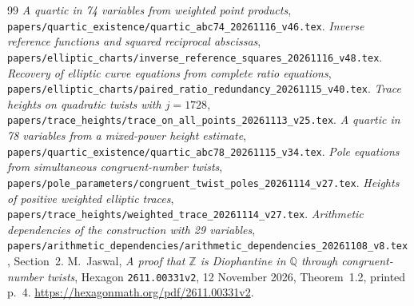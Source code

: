 \documentclass[11pt,a4paper]{article}
\newcommand{\Q}{\mathbb Q}\newcommand{\Z}{\mathbb Z}
\begin{document}
\begin{thebibliography}{99}
\emph{A quartic in 74 variables from weighted point products},
\nolinkurl{papers/quartic_existence/quartic_abc74_20261116_v46.tex}.
\emph{Inverse reference functions and squared reciprocal abscissas},
\nolinkurl{papers/elliptic_charts/inverse_reference_squares_20261116_v48.tex}.
\emph{Recovery of elliptic curve equations from complete ratio equations},
\nolinkurl{papers/elliptic_charts/paired_ratio_redundancy_20261115_v40.tex}.
\emph{Trace heights on quadratic twists with $j=1728$},
\nolinkurl{papers/trace_heights/trace_on_all_points_20261113_v25.tex}.
\emph{A quartic in 78 variables from a mixed-power height estimate},
\nolinkurl{papers/quartic_existence/quartic_abc78_20261115_v34.tex}.
\emph{Pole equations from simultaneous congruent-number twists},
\nolinkurl{papers/pole_parameters/congruent_twist_poles_20261114_v27.tex}.
\emph{Heights of positive weighted elliptic traces},
\nolinkurl{papers/trace_heights/weighted_trace_20261114_v27.tex}.
\emph{Arithmetic dependencies of the construction with 29 variables},
\nolinkurl{papers/arithmetic_dependencies/arithmetic_dependencies_20261108_v8.tex},
Section~2.
 M.~Jaswal, \emph{A proof that $\Z$ is Diophantine in $\Q$
through congruent-number twists}, Hexagon \texttt{2611.00331v2},
12 November 2026, Theorem~1.2, printed p.~4.
\url{https://hexagonmath.org/pdf/2611.00331v2}.
\end{thebibliography}
\end{document}
